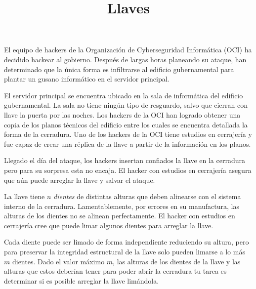 \documentclass{oci}
\title{Llaves}
\begin{document}
\begin{problemDescription}
El equipo de hackers de la Organización de Cyberseguridad Informática (OCI)
ha decidido hackear al gobierno.
Después de largas horas planeando su ataque, han determinado que la única forma es infiltrarse
al edificio gubernamental para plantar un gusano informático en el servidor principal.

El servidor principal se encuentra ubicado en la sala de informática del edificio gubernamental.
La sala no tiene ningún tipo de resguardo, salvo que cierran con llave la puerta por las noches.
Los hackers de la OCI han logrado obtener una copia de los planos técnicos del edificio entre los
cuales se encuentra detallada la forma de la cerradura.
Uno de los hackers de la OCI tiene estudios en cerrajería y fue capaz de crear una réplica de la
llave a partir de la información en los planos.

Llegado el día del ataque, los hackers insertan confiados la llave en la cerradura pero para
su sorpresa esta no encaja.
El hacker con estudios en cerrajería asegura que aún puede arreglar la llave y salvar
el ataque.

La llave tiene $n$ \emph{dientes} de distintas alturas que deben alinearse con el sistema
interno de la cerradura.
Lamentablemente, por errores en su manufactura, las alturas de los dientes
no se alinean perfectamente.
El hacker con estudios en cerrajería cree que puede limar algunos dientes para arreglar la llave.

Cada diente puede ser limado de forma independiente reduciendo su altura, pero para preservar
la integridad estructural de la llave solo pueden limarse a lo más $m$ dientes.
Dado el valor máximo $m$, las alturas de los dientes de la llave y las alturas que estos deberían
tener para poder abrir la cerradura tu tarea es determinar si es posible arreglar la llave
limándola.




\end{problemDescription}
\end{document}
